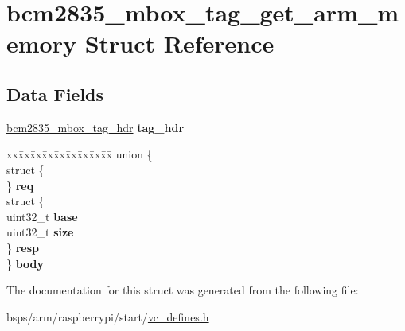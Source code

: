 \hypertarget{structbcm2835__mbox__tag__get__arm__memory}{}\section{bcm2835\+\_\+mbox\+\_\+tag\+\_\+get\+\_\+arm\+\_\+memory Struct Reference}
\label{structbcm2835__mbox__tag__get__arm__memory}
\subsection*{Data Fields}
\begin{DoxyCompactItemize}
\item 
\mbox{\label{structbcm2835__mbox__tag__get__arm__memory_af8863d59bae98dafcb13a6313ca65c4c}} 
\mbox{\hyperlink{structbcm2835__mbox__tag__hdr}{bcm2835\+\_\+mbox\+\_\+tag\+\_\+hdr}} {\bfseries tag\+\_\+hdr}
\item 
\mbox{\label{structbcm2835__mbox__tag__get__arm__memory_a6c2cb2a92f3dca27f130bfa339b9da13}} 
\begin{tabbing}
xx\=xx\=xx\=xx\=xx\=xx\=xx\=xx\=xx\=\kill
union \{\\
\>struct \{\\
\>\} {\bfseries req}\\
\>struct \{\\
\>\>uint32\_t {\bfseries base}\\
\>\>uint32\_t {\bfseries size}\\
\>\} {\bfseries resp}\\
\} {\bfseries body}\\

\end{tabbing}\end{DoxyCompactItemize}


The documentation for this struct was generated from the following file\+:\begin{DoxyCompactItemize}
\item 
bsps/arm/raspberrypi/start/\mbox{\hyperlink{vc__defines_8h}{vc\+\_\+defines.\+h}}\end{DoxyCompactItemize}
